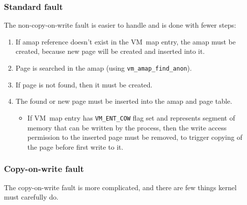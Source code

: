 \subsubsection{Standard fault}

The non-copy-on-write fault is easier to handle and is done with fewer steps:

\begin{enumerate}
  \item If amap reference doesn't exist in the VM~map entry, the amap must be created, because new page will be created and inserted into it.
  \item Page is searched in the amap (using \texttt{vm_amap_find_anon}).
  \item If page is not found, then it must be created.
  \item The found or new page must be inserted into the amap and page table.
    \begin{itemize}
      \item If VM~map entry has \texttt{VM_ENT_COW} flag set and represents segment of memory that can be written by the process,
        then the write access permission to the inserted page must be removed, to trigger copying of the page before first write to it.
    \end{itemize}
\end{enumerate}


\subsubsection{Copy-on-write fault}

The copy-on-write fault is more complicated, and there are few things kernel must carefully do.

